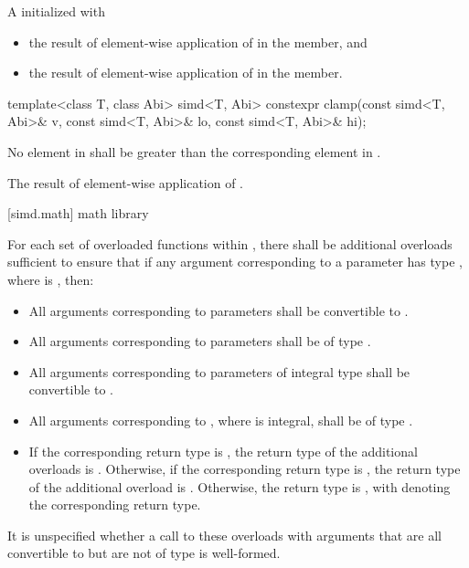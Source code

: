 \begin{itemdescr}
  \pnum\returns
  A  initialized with
  \begin{itemize}
    \item the result of element-wise application of  \foralli{} in the  member, and
    \item the result of element-wise application of  \foralli{} in the  member.
  \end{itemize}
\end{itemdescr}

\begin{itemdecl}
template<class T, class Abi> simd<T, Abi>
  constexpr clamp(const simd<T, Abi>& v, const simd<T, Abi>& lo, const simd<T, Abi>& hi);
\end{itemdecl}

\begin{itemdescr}
  \pnum\requires
  No element in  shall be greater than the corresponding element in .

  \pnum\returns
  The result of element-wise application of  \foralli.
\end{itemdescr}

[simd.math]{\texorpdfstring{ math}{simd math} library}

\pnum
For each set of overloaded functions within , there shall be additional overloads sufficient to ensure that if any argument corresponding to a  parameter has type , where  is , then:
\begin{itemize}
  \item All arguments corresponding to  parameters shall be convertible to .
  \item All arguments corresponding to  parameters shall be of type .
  \item All arguments corresponding to parameters of integral type  shall be convertible to .
  \item All arguments corresponding to , where  is integral, shall be of type .
  \item If the corresponding return type is , the return type of the additional overloads is . Otherwise, if the corresponding return type is , the return type of the additional overload is . Otherwise, the return type is , with  denoting the corresponding return type.
\end{itemize}
It is unspecified whether a call to these overloads with arguments that are all convertible to  but are not of type  is well-formed.

